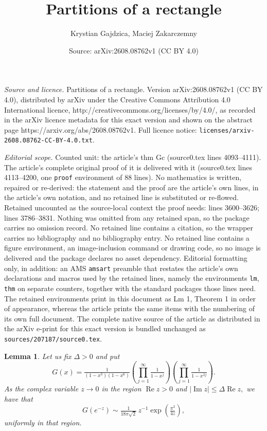 \documentclass[10pt,a4paper]{amsart}
\title{Partitions of a rectangle}
\author{Krystian Gajdzica, Maciej Zakarczemny}
\date{Source: arXiv:2608.08762v1 (CC BY 4.0)}
\newtheorem{lm}{Lemma}
\begin{document}
\maketitle

\noindent\emph{Source and licence.} Partitions of a rectangle. Version arXiv:2608.08762v1 (CC BY 4.0), distributed by arXiv under the Creative Commons Attribution 4.0 International licence, http://creativecommons.org/licenses/by/4.0/, as recorded in the arXiv licence metadata for this exact version and shown on the abstract page https://arxiv.org/abs/2608.08762v1. Full licence notice: \texttt{licenses/arxiv-2608.08762-CC-BY-4.0.txt}.\par\smallskip

\noindent\textit{Editorial scope.} Counted unit: the article's thm Gc (source0.tex lines 4093--4111). The article's complete original proof of it is delivered with it (source0.tex lines 4113--4200, one \texttt{proof} environment of 88 lines). No mathematics is written, repaired or re-derived: the statement and the proof are the article's own lines, in the article's own notation, and no retained line is substituted or re-flowed.  Retained uncounted as the source-local context the proof needs: lines 3600--3626; lines 3786--3831.  Nothing was omitted from any retained span, so the package carries no omission record.  No retained line contains a citation, so the wrapper carries no bibliography and no bibliography entry.  No retained line contains a figure environment, an image-inclusion command or drawing code, so no image is delivered and the package declares no asset dependency.  Editorial formatting only, in addition: an AMS \texttt{amsart} preamble that restates the article's own declarations and macros used by the retained lines, namely the environments \texttt{lm}, \texttt{thm} on separate counters, together with the standard packages those lines need.  The retained environments print in this document as Lm 1, Theorem 1 in order of appearance, whereas the article prints the same items with the numbering of its own full document.  The complete native source of the article as distributed in the arXiv e-print for this exact version is bundled unchanged as \texttt{sources/207187/source0.tex}.
\begin{lm}\label{Gcomasym}
Let us fix $\Delta>0$ and put
$$
G(x)=
\tfrac{1}{(1-x^3)(1-x^6)}
\left(\prod_{j=1}^\infty\tfrac{1}{1-x^j}\right)
\left(\prod_{j=1}^\infty\tfrac{1}{1-x^{2j}}\right).
$$
As the complex variable $z\to0$ in the region
$
\operatorname{Re}z>0
$
and
$
|\operatorname{Im}z|
\le 
\Delta\operatorname{Re}z,
$
we have that
$$
G(e^{-z})
\sim
\tfrac{1}{18\pi\sqrt2}\,z^{-1}
\exp\left(\tfrac{\pi^2}{4z}\right),
$$
uniformly in that region.
\end{lm}
\end{document}

